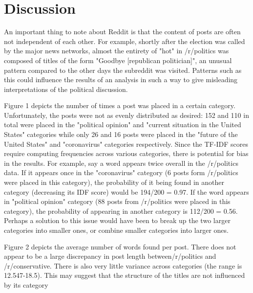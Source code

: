 \documentclass[11pt]{article}
\begin{document}
\section{Discussion}

An important thing to note about Reddit is that the content of posts are often not independent of each other. For example, shortly after the election was called by the major news networks, almost the entirety of "hot" in /r/politics was composed of titles of the form "Goodbye [republican politician]", an unusual pattern compared to the other days the subreddit was visited. Patterns such as this could influence the results of an analysis in such a way to give misleading interpretations of the political discussion.

Figure 1 depicts the number of times a post was placed in a certain category. Unfortunately, the posts were not as evenly distributed as desired: 152 and 110 in total were placed in the "political opinion" and "current situation in the United States" categories while only 26 and 16 posts were placed in the "future of the United States" and "coronavirus" categories respectively. Since the TF-IDF scores require computing frequencies across various categories, there is potential for bias in the results. For example, say a word appears twice overall in the /r/politics data. If it appears once in the "coronavirus" category (6 posts form /r/politics were placed in this category), the probability of it being found in another category (decreasing its IDF score) would be 194/200 = 0.97. If the word appears in "political opinion" category (88 posts from /r/politics were placed in this category), the probability of appearing in another category is 112/200 = 0.56. Perhaps a solution to this issue would have been to break up the two larger categories into smaller ones, or combine smaller categories into larger ones.

Figure 2 depicts the average number of words found per post. There does not appear to be a large discrepancy in post length between/r/politics and /r/conservative. There is also very little variance across categories (the range is 12.547-18.5). This may suggest that the structure of the titles are not influenced by its category
\end{document}
